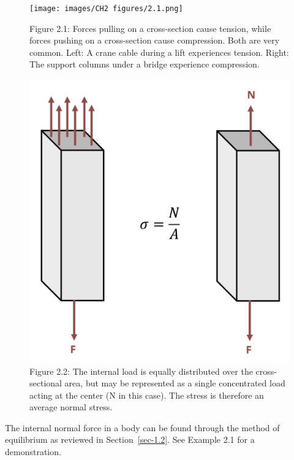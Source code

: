 \documentclass[
  letterpaper,
  DIV=11,
  numbers=noendperiod]{scrreprt}
\theoremstyle{definition}
\theoremstyle{remark}
\begin{document}
\begin{figure}[H]

{\centering \texttt{[image: images/CH2 figures/2.1.png]}

}

\caption{Figure 2.1: Forces pulling on a cross-section cause tension,
while forces pushing on a cross-section cause compression. Both are very
common. Left: A crane cable during a lift experiences tension. Right:
The support columns under a bridge experience compression.}

\end{figure}%
\begin{figure}[H]

{\centering \includegraphics{images/CH2 figures/2.2.png}

}

\caption{Figure 2.2: The internal load is equally distributed over the
cross-sectional area, but may be represented as a single concentrated
load acting at the center (N in this case). The stress is therefore an
average normal stress.}

\end{figure}%

The internal normal force in a body can be found through the method of
equilibrium as reviewed in Section~\ref{sec-1.2}. See Example 2.1 for a
demonstration.
\end{document}
